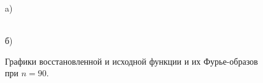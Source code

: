 \documentclass[a5paper, 10pt]{article}
\theoremstyle{definition}
\theoremstyle{plain}
\theoremstyle{remark}
\begin{document}
\begin{figure}[h!]
\begin{minipage}[h!]{0.5\linewidth}
 a) \\
\end{minipage}
\hfill
\begin{minipage}[h!]{0.5\linewidth}
 \\б)
\end{minipage}
\caption{ Графики восстановленной и исходной функции и их Фурье-образов при $n=90$.}
\end{figure}


\newpage
\end{document}
